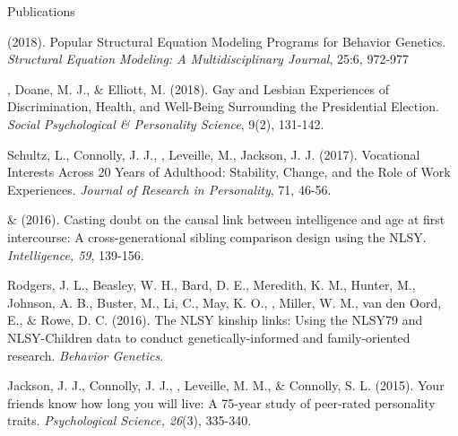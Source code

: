 \begin{rSection}{\textrm{Publications}}
\begin{etaremune}
%
\item \meb (2018). Popular Structural Equation Modeling Programs for Behavior Genetics. \textit{Structural Equation Modeling: A Multidisciplinary Journal}, 25:6, 972-977 
%
\item\meb, Doane, M. J., \& Elliott, M. (2018). Gay and Lesbian Experiences of Discrimination, Health, and Well-Being Surrounding the Presidential Election. \textit{Social Psychological \& Personality Science}, 9(2), 131-142. 
%
\item Schultz, L., Connolly, J. J., \meb, Leveille, M., Jackson, J. J. (2017). Vocational Interests Across 20 Years of Adulthood: Stability, Change, and the Role of Work Experiences. \textit{Journal of Research in Personality}, 71, 46-56.
\item \meb \& \Joe (2016). Casting doubt on the causal link between intelligence and age at first intercourse: A cross-generational sibling comparison design using the NLSY. \textit{Intelligence, 59}, 139-156. 
%
\item Rodgers, J. L., Beasley, W. H., Bard, D. E., Meredith, K. M., Hunter, M., Johnson, A. B., Buster, M., Li, C., May, K. O., \meb, Miller, W. M., van den Oord, E., \& Rowe, D. C. (2016). The NLSY kinship links: Using the NLSY79 and NLSY-Children data to conduct genetically-informed and family-oriented research. \textit{Behavior Genetics}. 
%
\item Jackson, J. J., Connolly, J. J., \meb, Leveille, M. M., \& Connolly, S. L. (2015). Your friends know how long you will live: A 75-year study of peer-rated personality traits. \textit{Psychological Science, 26}(3), 335-340. 
%
\end{etaremune}\end{rSection}%
